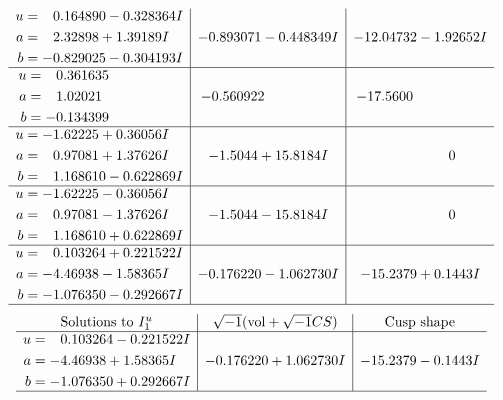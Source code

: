 \documentclass[1p]{elsarticle_modified}
\theoremstyle{definition}
\newcommand{\I}{\sqrt{-1}}
\begin{document}
$$\begin{array}{c|c|c}
\begin{aligned}
u &= \phantom{-}0.164890 - 0.328364 I \\
a &= \phantom{-}2.32898 + 1.39189 I \\
b &= -0.829025 - 0.304193 I\end{aligned}
 & -0.893071 - 0.448349 I & -12.04732 - 1.92652 I \\ \hline\begin{aligned}
u &= \phantom{-}0.361635\phantom{ +0.000000I} \\
a &= \phantom{-}1.02021\phantom{ +0.000000I} \\
b &= -0.134399\phantom{ +0.000000I}\end{aligned}
 & -0.560922\phantom{ +0.000000I} & -17.5600\phantom{ +0.000000I} \\ \hline\begin{aligned}
u &= -1.62225 + 0.36056 I \\
a &= \phantom{-}0.97081 + 1.37626 I \\
b &= \phantom{-}1.168610 - 0.622869 I\end{aligned}
 & -1.5044 + 15.8184 I & \phantom{-0.000000 } 0 \\ \hline\begin{aligned}
u &= -1.62225 - 0.36056 I \\
a &= \phantom{-}0.97081 - 1.37626 I \\
b &= \phantom{-}1.168610 + 0.622869 I\end{aligned}
 & -1.5044 - 15.8184 I & \phantom{-0.000000 } 0 \\ \hline\begin{aligned}
u &= \phantom{-}0.103264 + 0.221522 I \\
a &= -4.46938 - 1.58365 I \\
b &= -1.076350 - 0.292667 I\end{aligned}
 & -0.176220 - 1.062730 I & -15.2379 + 0.1443 I\\
 \hline 
 \end{array}$$\newpage$$\begin{array}{c|c|c}  
\text{Solutions to }I^u_{1}& \I (\text{vol} + \sqrt{-1}CS) & \text{Cusp shape}\\
 \hline 
\begin{aligned}
u &= \phantom{-}0.103264 - 0.221522 I \\
a &= -4.46938 + 1.58365 I \\
b &= -1.076350 + 0.292667 I\end{aligned}
 & -0.176220 + 1.062730 I & -15.2379 - 0.1443 I\\
 \hline 
 \end{array}$$\newpage\newpage\renewcommand{\arraystretch}{1}
\end{document}
